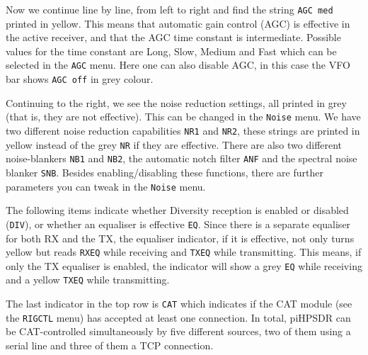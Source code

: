 \documentclass[12pt]{book}
\def\rett#1{\texttt{\color{red}#1}}
\def\bltt#1{\texttt{\color{blue}#1}}
\def\pH{pi\-HPSDR }
\begin{document}
Now we continue line by line, from left to right and find
the string \rett{AGC med} printed in yellow. This means
that automatic gain control (AGC)  is effective  in the
active receiver, and that the AGC time constant is
intermediate. Possible values for the time constant
are Long, Slow, Medium and Fast which can be selected
in the \bltt{AGC} menu. Here one can  also disable AGC,
in this case the VFO bar shows \rett{AGC off} in grey
colour.

Continuing to the right, we see the noise reduction settings,
all printed in grey (that is, they are not effective). This
can be changed in the \bltt{Noise} menu. We have two different
noise reduction capabilities \rett{NR1} and \rett{NR2}, these
strings are printed in yellow instead of the grey \rett{NR} if
they are effective. There are also two different noise-blankers
\rett{NB1} and \rett{NB2}, the automatic notch  filter
\rett{ANF} and the spectral  noise blanker \rett{SNB}.
Besides enabling/disabling these functions, there are  further parameters
you can tweak in the \bltt{Noise} menu.

The following items indicate whether Diversity reception is enabled or disabled
(\rett{DIV}), or whether an equaliser is effective \rett{EQ}.
Since there is a separate equaliser for both RX and the TX,
the equaliser indicator, if it is effective, not only turns yellow
but reads \rett{RXEQ} while receiving and \rett{TXEQ} while
transmitting. This means, if only the TX equaliser is enabled,
the indicator will show a  grey \rett{EQ} while receiving
and a yellow \rett{TXEQ}  while  transmitting.

The last indicator in the top row  is \rett{CAT} which indicates
if the CAT module  (see the \bltt{RIGCTL}  menu) has accepted at least
one connection. In total, \pH can be CAT-controlled simultaneously
by five different sources, two of them using a serial line and
three of them a TCP connection.
\end{document}
